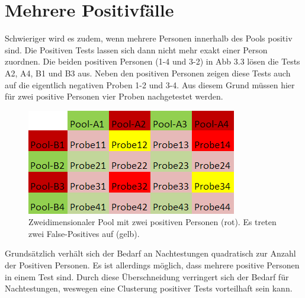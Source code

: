 \section{Mehrere Positivfälle}

Schwieriger wird es zudem, wenn mehrere Personen innerhalb des Pools positiv sind.
Die Positiven Tests lassen sich dann nicht mehr exakt einer Person zuordnen.
Die beiden positiven Personen (1-4 und 3-2) in Abb 3.3 lösen die Tests A2, A4, B1 und B3 aus.
Neben den positiven Personen zeigen diese Tests auch auf die eigentlich negativen Proben 1-2 und 3-4.
Aus diesem Grund müssen hier für zwei positive Personen vier Proben nachgetestet werden.

\begin{figure}[h]
	\centering
	\includegraphics[height=.25\textwidth]{img/2d_Pool_2Positiv}
	\caption{Zweidimensionaler Pool mit zwei positiven Personen (rot). Es treten zwei False-Positives auf (gelb).\footnotemark}
\end{figure}

Grundsätzlich verhält sich der Bedarf an Nachtestungen quadratisch zur Anzahl der Positiven Personen.
Es ist allerdings möglich, dass mehrere positive Personen in einem Test sind.
Durch diese Überschneidung verringert sich der Bedarf für Nachtestungen, weswegen eine Clusterung positiver Tests vorteilhaft sein kann.


\cleardoublepage
